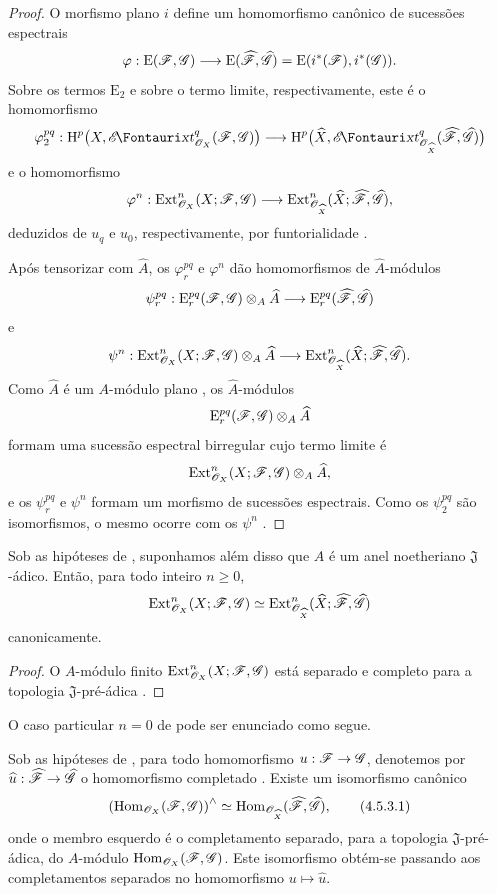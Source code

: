 \begin{proof}
O morfismo plano $i$ define um homomorfismo canônico de sucessões
espectrais
\[
  \varphi:\mathrm{E}(\mathscr{F},\mathscr{G})
  \longrightarrow
  \mathrm{E}(\widehat{\mathscr{F}},\widehat{\mathscr{G}})
  =
  \mathrm{E}(i^*(\mathscr{F}),i^*(\mathscr{G})).
\]
Sobre os termos $\mathrm{E}_2$ e sobre o termo limite,
respectivamente, este é o homomorfismo
\[
  \varphi_2^{pq}:
  \HH^p\bigl(X,\shExt^q_{\sh{O}_X}(\sh{F},\sh{G})\bigr)
  \longrightarrow
  \HH^p\bigl(\hat{X},
    \shExt^q_{\sh{O}_{\hat{X}}}
      (\hat{\sh{F}},\hat{\sh{G}})\bigr)
\]
e o homomorfismo
\[
  \varphi^n:
  \operatorname{Ext}^n_{\mathscr{O}_X}(X;\mathscr{F},\mathscr{G})
  \longrightarrow
  \operatorname{Ext}^n_{\mathscr{O}_{\widehat{X}}}
    (\widehat{X};\widehat{\mathscr{F}},\widehat{\mathscr{G}}),
\]
deduzidos de $u_q$ e $u_0$, respectivamente, por funtorialidade
.

Após tensorizar com $\hat{A}$, os $\varphi_r^{pq}$ e
$\varphi^n$ dão homomorfismos de $\hat{A}$-módulos
\[
  \psi_r^{pq}:
  \mathrm{E}_r^{pq}(\mathscr{F},\mathscr{G})\otimes_A\widehat{A}
  \longrightarrow
  \mathrm{E}_r^{pq}(\widehat{\mathscr{F}},\widehat{\mathscr{G}})
\]
e
\[
  \psi^n:
  \operatorname{Ext}^n_{\mathscr{O}_X}(X;\mathscr{F},\mathscr{G})\otimes_A\widehat{A}
  \longrightarrow
  \operatorname{Ext}^n_{\mathscr{O}_{\widehat{X}}}
    (\widehat{X};\widehat{\mathscr{F}},\widehat{\mathscr{G}}).
\]
Como $\hat{A}$ é um $A$-módulo plano , os
$\hat{A}$-módulos
\[
  \mathrm{E}_r^{pq}(\mathscr{F},\mathscr{G})\otimes_A\widehat{A}
\]
formam uma sucessão espectral birregular cujo termo limite é
\[
  \operatorname{Ext}^n_{\mathscr{O}_X}(X;\mathscr{F},\mathscr{G})\otimes_A\widehat{A},
\]
e os $\psi_r^{pq}$ e $\psi^n$ formam um morfismo de sucessões
espectrais. Como os $\psi_2^{pq}$ são isomorfismos, o mesmo ocorre
com os $\psi^n$ .
\end{proof}

\begin{corollary}[4.5.2]
\label{III.4.5.2}
Sob as hipóteses de , suponhamos além disso que $A$ é
um anel noetheriano $\mathfrak J$-ádico. Então, para todo inteiro
$n\geq0$,
\[
  \operatorname{Ext}^n_{\mathscr{O}_X}(X;\mathscr{F},\mathscr{G})
  \simeq
  \operatorname{Ext}^n_{\mathscr{O}_{\widehat{X}}}
    (\widehat{X};\widehat{\mathscr{F}},\widehat{\mathscr{G}})
\]
canonicamente.
\end{corollary}

\begin{proof}
O $A$-módulo finito
$\operatorname{Ext}^n_{\mathscr{O}_X}(X;\mathscr{F},\mathscr{G})$ está separado e completo para a
topologia $\mathfrak J$-pré-ádica .
\end{proof}

O caso particular $n=0$ de  pode ser enunciado como
segue.

\begin{corollary}[4.5.3]
\label{III.4.5.3}
Sob as hipóteses de , para todo homomorfismo
$u:\sh{F}\to\sh{G}$, denotemos por
$\hat{u}:\hat{\sh{F}}\to\hat{\sh{G}}$ o homomorfismo completado
. Existe um isomorfismo canônico
\[
\label{III.4.5.3.1}
  \left(\Hom_{\sh{O}_X}(\sh{F},\sh{G})\right)^\wedge
  \isoto
  \Hom_{\sh{O}_{\hat{X}}}(\hat{\sh{F}},\hat{\sh{G}}),
  \tag{4.5.3.1}
\]
onde o membro esquerdo é o completamento separado, para a
topologia $\mathfrak J$-pré-ádica, do $A$-módulo
$\operatorname{Hom}_{\mathscr{O}_X}(\mathscr{F},\mathscr{G})$. Este isomorfismo obtém-se passando
aos completamentos separados no homomorfismo
$u\mapsto\hat{u}$.
\end{corollary}


